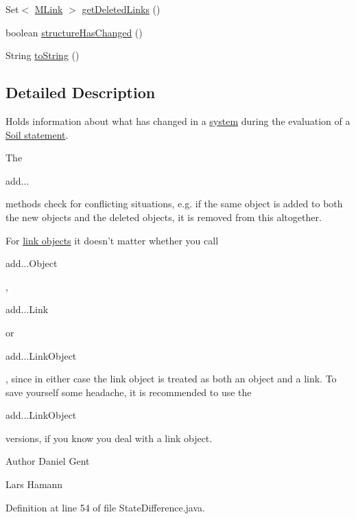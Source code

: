 \begin{DoxyCompactItemize}
\item 
Set$<$ \hyperlink{interfaceorg_1_1tzi_1_1use_1_1uml_1_1sys_1_1_m_link}{M\-Link} $>$ \hyperlink{classorg_1_1tzi_1_1use_1_1util_1_1soil_1_1_state_difference_a507df4924369c0a4efe49cf26136cd0d}{get\-Deleted\-Links} ()
\item 
boolean \hyperlink{classorg_1_1tzi_1_1use_1_1util_1_1soil_1_1_state_difference_a0e3364b96e469df6f4fb2e29fdb26fcb}{structure\-Has\-Changed} ()
\item 
String \hyperlink{classorg_1_1tzi_1_1use_1_1util_1_1soil_1_1_state_difference_a66086f72fd70d971fa7f6521c6a69feb}{to\-String} ()
\end{DoxyCompactItemize}


\subsection{Detailed Description}
Holds information about what has changed in a \hyperlink{}{system} during the evaluation of a \hyperlink{}{Soil statement}. 

The
\begin{DoxyCode}
add... 
\end{DoxyCode}
 methods check for conflicting situations, e.\-g. if the same object is added to both the new objects and the deleted objects, it is removed from this altogether. 

For \hyperlink{}{link objects} it doesn't matter whether you call 
\begin{DoxyCode}
add...Object 
\end{DoxyCode}
 ,
\begin{DoxyCode}
add...Link 
\end{DoxyCode}
 or
\begin{DoxyCode}
add...LinkObject 
\end{DoxyCode}
 , since in either case the link object is treated as both an object and a link. To save yourself some headache, it is recommended to use the 
\begin{DoxyCode}
add...LinkObject 
\end{DoxyCode}
 versions, if you know you deal with a link object.

\begin{DoxyAuthor}{Author}
Daniel Gent 

Lars Hamann 
\end{DoxyAuthor}


Definition at line 54 of file State\-Difference.\-java.



